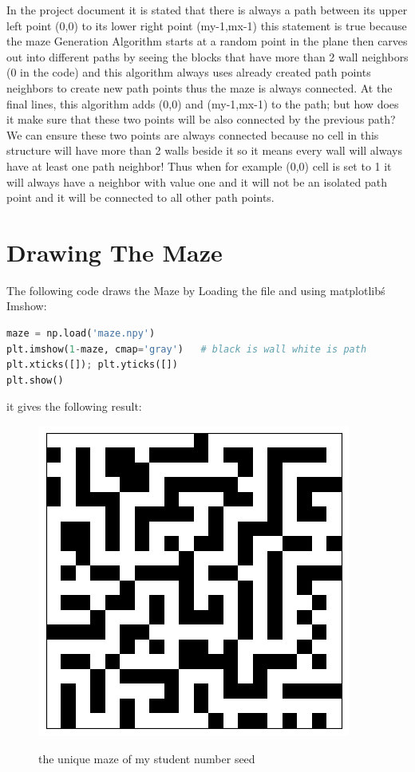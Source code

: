 \documentclass[11pt]{article}
\begin{document}
In the project document it is stated that there is always a path between its
upper left point (0,0) to its lower right point (my-1,mx-1) this statement is
true because the maze Generation Algorithm starts at a random point in the plane
then carves out into different paths by seeing the blocks that have more than 2
wall neighbors (0 in the code) and this algorithm always uses already created path
points neighbors to create new path points thus the maze is always connected. At the
final lines, this algorithm adds (0,0) and (my-1,mx-1) to the path; but how
does it make sure that these two points will be also connected by the previous path? \\
We can ensure these two points are always connected because no cell in this structure
will have more than 2 walls beside it so it means every wall will always have at least
one path neighbor! Thus when for example (0,0) cell is set to 1 it will always have
a neighbor with value one and it will not be an isolated path point and it will be connected
to all other path points.

\section{Drawing The Maze}
The following code draws the Maze by Loading the file and using matplotlib\'s Imshow:


\begin{lstlisting}[language=Python]
maze = np.load('maze.npy')
plt.imshow(1-maze, cmap='gray')   # black is wall white is path
plt.xticks([]); plt.yticks([])
plt.show()
\end{lstlisting}

it gives the following result:
\begin{figure}[H]
    \begin{center}
        \includegraphics[scale=0.7]{Fig/maze.png}
        \label{fig:xt&xnfft}
        \caption{the unique maze of my student number seed}
    \end{center}
\end{figure}
\end{document}

